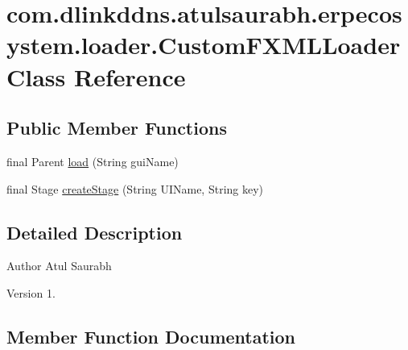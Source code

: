 \hypertarget{classcom_1_1dlinkddns_1_1atulsaurabh_1_1erpecosystem_1_1loader_1_1_custom_f_x_m_l_loader}{}\section{com.\+dlinkddns.\+atulsaurabh.\+erpecosystem.\+loader.\+Custom\+F\+X\+M\+L\+Loader Class Reference}
\label{classcom_1_1dlinkddns_1_1atulsaurabh_1_1erpecosystem_1_1loader_1_1_custom_f_x_m_l_loader}
\subsection*{Public Member Functions}
\begin{DoxyCompactItemize}
\item 
final Parent \mbox{\hyperlink{classcom_1_1dlinkddns_1_1atulsaurabh_1_1erpecosystem_1_1loader_1_1_custom_f_x_m_l_loader_a7e3c0b074c43866c2950964b208b2bef}{load}} (String gui\+Name)
\item 
final Stage \mbox{\hyperlink{classcom_1_1dlinkddns_1_1atulsaurabh_1_1erpecosystem_1_1loader_1_1_custom_f_x_m_l_loader_abd9fb19f6b3d55a6044e83db37b23fd4}{create\+Stage}} (String U\+I\+Name, String key)
\end{DoxyCompactItemize}


\subsection{Detailed Description}
\begin{DoxyAuthor}{Author}
Atul Saurabh 
\end{DoxyAuthor}
\begin{DoxyVersion}{Version}
1. 
\end{DoxyVersion}


\subsection{Member Function Documentation}
\mbox{\label{classcom_1_1dlinkddns_1_1atulsaurabh_1_1erpecosystem_1_1loader_1_1_custom_f_x_m_l_loader_abd9fb19f6b3d55a6044e83db37b23fd4}} 
